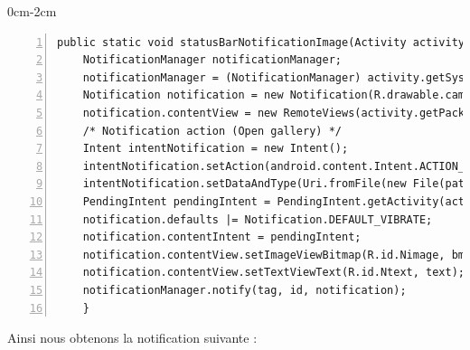 \begin{changemargin}{0cm}{-2cm}
\begin{lstlisting}[caption={ImageView address resolver},
framexleftmargin=7mm, numbers=left] 
 public static void statusBarNotificationImage(Activity activity, Bitmap bmp, String text, String path, int id, String tag) {
	NotificationManager notificationManager;
	notificationManager = (NotificationManager) activity.getSystemService(Context.NOTIFICATION_SERVICE);
	Notification notification = new Notification(R.drawable.camera,	"Camera-Axis", System.currentTimeMillis());
	notification.contentView = new RemoteViews(activity.getPackageName(), R.layout.notification);
	/* Notification action (Open gallery) */ 
	Intent intentNotification = new Intent();
	intentNotification.setAction(android.content.Intent.ACTION_VIEW);
	intentNotification.setDataAndType(Uri.fromFile(new File(path)), "image/png");
	PendingIntent pendingIntent = PendingIntent.getActivity(activity.getApplicationContext(), 0, intentNotification, 0);
	notification.defaults |= Notification.DEFAULT_VIBRATE;
	notification.contentIntent = pendingIntent;
	notification.contentView.setImageViewBitmap(R.id.Nimage, bmp);
	notification.contentView.setTextViewText(R.id.Ntext, text);
	notificationManager.notify(tag, id, notification);
    }
\end{lstlisting}   
\end{changemargin}
Ainsi nous obtenons la notification suivante : 

